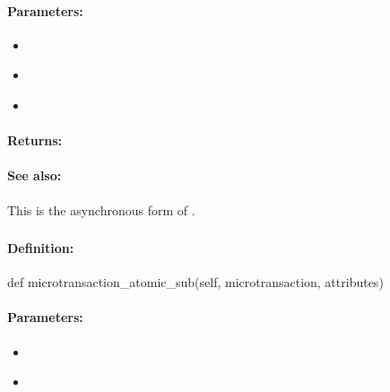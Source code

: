 \paragraph{Parameters:}
\begin{itemize}[noitemsep]
\item {}\\

\item {}\\

\item {}\\

\end{itemize}

\paragraph{Returns:}


\paragraph{See also:}  This is the asynchronous form of .

\pagebreak
\subsubsection{}
\label{api:python:microtransaction_atomic_sub}


\paragraph{Definition:}
\begin{pythoncode}
def microtransaction_atomic_sub(self, microtransaction, attributes)
\end{pythoncode}

\paragraph{Parameters:}
\begin{itemize}[noitemsep]
\item {}\\

\item {}\\

\end{itemize}

